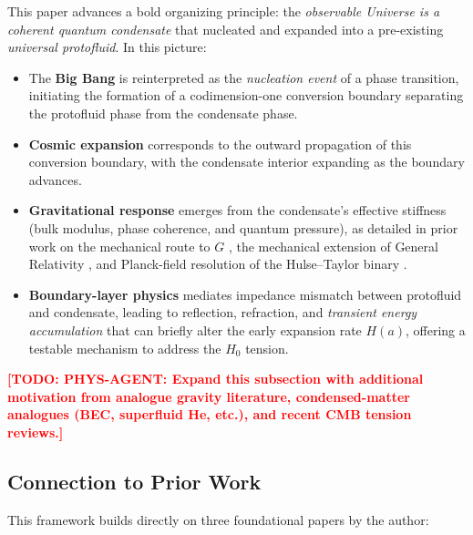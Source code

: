 \documentclass[11pt,a4paper]{article}
\theoremstyle{definition}
\newcommand{\TODO}[1]{\textcolor{red}{\textbf{[TODO: #1]}}}
\begin{document}
This paper advances a bold organizing principle: the \emph{observable Universe is a coherent quantum condensate} that nucleated and expanded into a pre-existing \emph{universal protofluid}. In this picture:
\begin{itemize}[leftmargin=1.8em]
  \item The \textbf{Big Bang} is reinterpreted as the \emph{nucleation event} of a phase transition, initiating the formation of a codimension-one conversion boundary separating the protofluid phase from the condensate phase.
  \item \textbf{Cosmic expansion} corresponds to the outward propagation of this conversion boundary, with the condensate interior expanding as the boundary advances.
  \item \textbf{Gravitational response} emerges from the condensate's effective stiffness (bulk modulus, phase coherence, and quantum pressure), as detailed in prior work on the mechanical route to $G$ \cite{SkavbergMechG2025}, the mechanical extension of General Relativity \cite{SkavbergMechGR2025}, and Planck-field resolution of the Hulse--Taylor binary \cite{SkavbergPlanckField2025}.
  \item \textbf{Boundary-layer physics} mediates impedance mismatch between protofluid and condensate, leading to reflection, refraction, and \emph{transient energy accumulation} that can briefly alter the early expansion rate $H(a)$, offering a testable mechanism to address the $H_0$ tension.
\end{itemize}

\TODO{PHYS-AGENT: Expand this subsection with additional motivation from analogue gravity literature, condensed-matter analogues (BEC, superfluid He, etc.), and recent CMB tension reviews.}

\subsection{Connection to Prior Work}
\label{sec:prior_work}

This framework builds directly on three foundational papers by the author:
\end{document}

